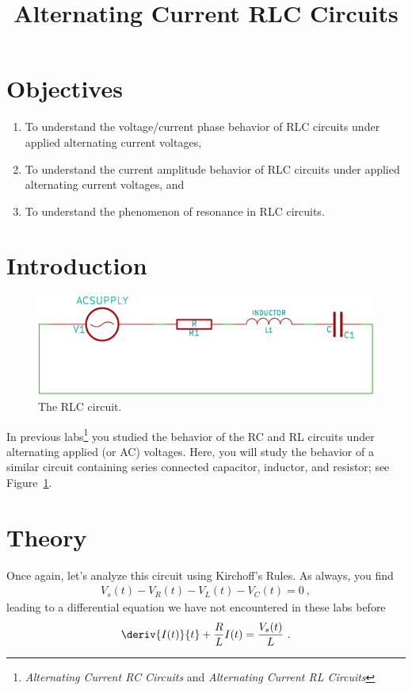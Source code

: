 \documentclass[12pt]{article}
\title{Alternating Current RLC Circuits}
\author{}
\date{}
\begin{document}
\maketitle

\section{Objectives}
\label{sec:objectives}

\begin{enumerate}
\item To understand the voltage/current phase behavior of RLC circuits
  under applied alternating current voltages,
\item To understand the current amplitude behavior of RLC circuits
  under applied alternating current voltages, and
\item To understand the phenomenon of resonance in RLC circuits.
\end{enumerate}

\section{Introduction}
\label{sec:introduction}

\begin{figure}
  \centering
  \includegraphics[width=2\textwidth/3]{figures/rlc-circuit}
  \caption{The RLC circuit.}
  \label{fig:rlccircuit}
\end{figure}
In previous labs\footnote{\textit{Alternating Current RC Circuits}
  and \textit{Alternating Current RL Circuits}} you studied the
behavior of the RC and RL circuits under alternating applied (or AC)
voltages.  Here, you will study the behavior of a similar circuit
containing series connected capacitor, inductor, and resistor; see
Figure~\ref{fig:rlccircuit}.

\section{Theory}
\label{sec:theory}

Once again, let's analyze this circuit using Kirchoff's Rules.  As
always, you find
\begin{gather*}
  V_s(t) - V_R(t) - V_L(t) - V_C(t) = 0\ ,
\end{gather*}
leading to a differential equation we have not encountered in these
labs before
\begin{gather*}
  \deriv{I(t)}{t} + \frac{R}{L} I(t) = \frac{V_s(t)}{L}\ .
\end{gather*}
\end{document}
